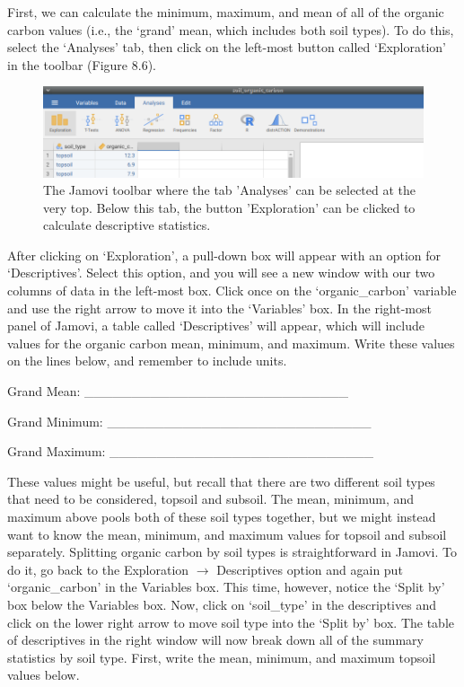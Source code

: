\documentclass[
]{scrbook}
\begin{document}
First, we can calculate the minimum, maximum, and mean of all of the organic carbon values (i.e., the `grand' mean, which includes both soil types).
To do this, select the `Analyses' tab, then click on the left-most button called `Exploration' in the toolbar (Figure 8.6).

\begin{figure}
\includegraphics[width=1\linewidth]{img/jamovi_exploration} \caption{The Jamovi toolbar where the tab 'Analyses' can be selected at the very top. Below this tab, the button 'Exploration' can be clicked to calculate descriptive statistics.}\label{fig:unnamed-chunk-29}
\end{figure}

After clicking on `Exploration', a pull-down box will appear with an option for `Descriptives'.
Select this option, and you will see a new window with our two columns of data in the left-most box.
Click once on the `organic\_carbon' variable and use the right arrow to move it into the `Variables' box.
In the right-most panel of Jamovi, a table called `Descriptives' will appear, which will include values for the organic carbon mean, minimum, and maximum.
Write these values on the lines below, and remember to include units.

Grand Mean: \_\_\_\_\_\_\_\_\_\_\_\_\_\_\_\_\_\_\_\_\_\_\_\_\_\_\_\_

Grand Minimum: \_\_\_\_\_\_\_\_\_\_\_\_\_\_\_\_\_\_\_\_\_\_\_\_\_\_\_\_

Grand Maximum: \_\_\_\_\_\_\_\_\_\_\_\_\_\_\_\_\_\_\_\_\_\_\_\_\_\_\_\_

These values might be useful, but recall that there are two different soil types that need to be considered, topsoil and subsoil.
The mean, minimum, and maximum above pools both of these soil types together, but we might instead want to know the mean, minimum, and maximum values for topsoil and subsoil separately.
Splitting organic carbon by soil types is straightforward in Jamovi.
To do it, go back to the Exploration \(\to\) Descriptives option and again put `organic\_carbon' in the Variables box.
This time, however, notice the `Split by' box below the Variables box.
Now, click on `soil\_type' in the descriptives and click on the lower right arrow to move soil type into the `Split by' box.
The table of descriptives in the right window will now break down all of the summary statistics by soil type.
First, write the mean, minimum, and maximum topsoil values below.
\end{document}
